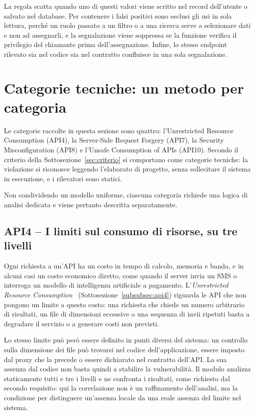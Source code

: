 La regola scatta quando uno di questi valori viene scritto nel record
dell'utente o salvato nel database. Per contenere i falsi positivi sono esclusi
gli usi in sola lettura, perché un ruolo passato a un filtro o a una ricerca
serve a selezionare dati e non ad assegnarli, e la segnalazione viene soppressa
se la funzione verifica il privilegio del chiamante prima dell'assegnazione.
Infine, lo stesso endpoint rilevato sia nel codice sia nel contratto confluisce
in una sola segnalazione.

\section{Categorie tecniche: un metodo per categoria}
\label{sec:categorie-tecniche}

Le categorie raccolte in questa sezione sono quattro: l'Unrestricted Resource
Consumption (API4), la Server-Side Request Forgery (API7), la Security
Misconfiguration (API8) e l'Unsafe Consumption of APIs (API10). Secondo il
criterio della Sottosezione~\ref{sec:criterio} si comportano come categorie
tecniche: la violazione si riconosce leggendo l'elaborato di progetto, senza
sollecitare il sistema in esecuzione, e i rilevatori sono statici.

Non condividendo un modello uniforme, ciascuna categoria richiede una logica di
analisi dedicata e viene pertanto descritta separatamente.

\subsection{API4 -- I limiti sul consumo di risorse, su tre livelli}
\label{sec:rilevamento-resource}

Ogni richiesta a un'API ha un costo in tempo di calcolo, memoria e banda, e in
alcuni casi un costo economico diretto, come quando il server invia un SMS o
interroga un modello di intelligenza artificiale a pagamento.
L'\emph{Unrestricted Resource Consumption}~\cite{owasp2023api4}
(Sottosezione~\ref{subsubsec:api4}) riguarda le API che non pongono un limite a
questo costo: una richiesta che chiede un numero arbitrario di risultati, un
file di dimensioni eccessive o una sequenza di invii ripetuti basta a degradare
il servizio o a generare costi non previsti.

Lo stesso limite può però essere definito in punti diversi del sistema: un
controllo sulla dimensione dei file può trovarsi nel codice dell'applicazione,
essere imposto dal proxy che la precede o essere dichiarato nel contratto
dell'API. La sua assenza dal codice non basta quindi a stabilire la
vulnerabilità. Il modulo analizza staticamente tutti e tre i livelli e ne
confronta i risultati, come richiesto dal secondo requisito: qui la correlazione non è un
raffinamento dell'analisi, ma la condizione per distinguere un'assenza locale
da una reale assenza del limite nel sistema.


